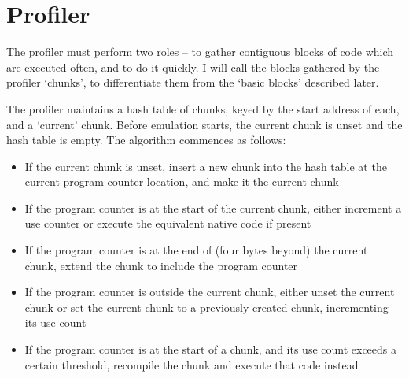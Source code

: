 \section{Profiler}

The profiler must perform two roles -- to gather contiguous blocks of code which are executed often, and to do it quickly. I will call the blocks gathered by the profiler `chunks', to differentiate them from the `basic blocks' described later.

The profiler maintains a hash table of chunks, keyed by the start address of each, and a `current' chunk. Before emulation starts, the current chunk is unset and the hash table is empty. The algorithm commences as follows:

\begin{itemize}

\item If the current chunk is unset, insert a new chunk into the hash table at the current program counter location, and make it the current chunk
\item If the program counter is at the start of the current chunk, either increment a use counter or execute the equivalent native code if present
\item If the program counter is at the end of (four bytes beyond) the current chunk, extend the chunk to include the program counter
\item If the program counter is outside the current chunk, either unset the current chunk or set the current chunk to a previously created chunk, incrementing its use count
\item If the program counter is at the start of a chunk, and its use count exceeds a certain threshold, recompile the chunk and execute that code instead

\end{itemize}

